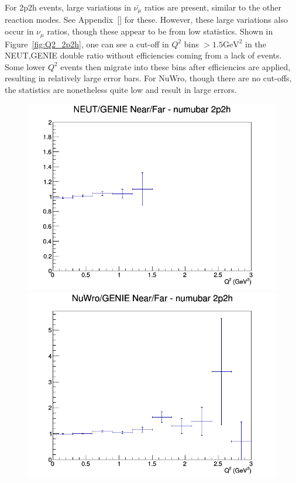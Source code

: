 \documentclass[12pt]{article}
\begin{document}
For 2p2h events, large variations in $\bar{\nu_{\mu}}$ ratios are present, similar to the other reaction modes. See Appendix~\ref{} for these. However, these large variations also occur in $\nu_{\mu}$ ratios, though these appear to be from low statistics. Shown in Figure~\ref{fig:Q2_2p2h}, one can see a cut-off in $Q^2$ bins $> \textrm{1.5} \textrm{GeV}^2$ in the NEUT,GENIE double ratio without efficiencies coming from a lack of events. Some lower $Q^2$ events then migrate into these bins after efficiencies are applied, resulting in relatively large error bars. For NuWro, though there are no cut-offs, the statistics are nonetheless quite low and result in large errors.

\begin{figure}[h]
\includegraphics[width=\linewidth]{Q2/nominal/ratios/2p2h_NEUT_GENIE_numubar_NF_Q2.png}
\endminipage
{}
\includegraphics[width=\linewidth]{Q2/nominal/ratios/2p2h_NuWro_GENIE_numubar_NF_Q2.png}

\end{figure}
\end{document}
